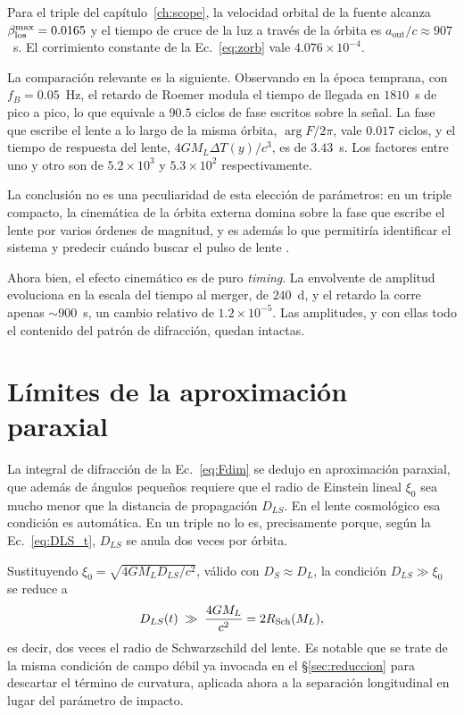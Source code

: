\documentclass[11pt,a4paper,openany]{book}
\newcommand{\aout}{a_{\mathrm{out}}}
\begin{document}
\begin{ejemplo}[title={Cinem\'atica frente a lente}]
Para el triple del cap\'itulo~\ref{ch:scope}, la velocidad orbital de la
fuente alcanza $\beta_{\rm los}^{\max}=0.0165$ y el tiempo de cruce de la luz
a trav\'es de la \'orbita es $\aout/c\approx907$~s. El corrimiento constante
de la Ec.~\eqref{eq:zorb} vale $4.076\times10^{-4}$.

La comparaci\'on relevante es la siguiente. Observando en la \'epoca
temprana, con $f_B=0.05$~Hz, el retardo de Roemer modula el tiempo de llegada
en $1810$~s de pico a pico, lo que equivale a $90.5$ ciclos de fase escritos
sobre la se\~nal. La fase que escribe el lente a lo largo de la misma
\'orbita, $\arg F/2\pi$, vale $0.017$ ciclos, y el tiempo de respuesta del
lente, $4GM_L\Delta T(y)/c^{3}$, es de $3.43$~s. Los factores entre uno y otro son de $5.2\times10^{3}$
y $5.3\times10^{2}$ respectivamente.

La conclusi\'on no es una peculiaridad de esta elecci\'on de par\'ametros: en
un triple compacto, la cinem\'atica de la \'orbita externa domina sobre la
fase que escribe el lente por varios \'ordenes de magnitud, y es adem\'as lo
que
permitir\'ia identificar el sistema y predecir cu\'ando buscar el pulso de
lente \citep{DOrazioLoeb2020}.

Ahora bien, el efecto cinem\'atico es de puro \emph{timing}. La envolvente de
amplitud evoluciona en la escala del tiempo al merger, de $240$~d, y el
retardo la corre apenas $\sim900$~s, un cambio relativo de
$1.2\times10^{-5}$. Las amplitudes, y con ellas todo el contenido del patr\'on
de difracci\'on, quedan intactas.
\end{ejemplo}

\section{L\'imites de la aproximaci\'on paraxial}
\label{sec:paraxial}

La integral de difracci\'on de la Ec.~\eqref{eq:Fdim} se dedujo en
aproximaci\'on paraxial, que adem\'as de \'angulos peque\~nos requiere que el
radio de Einstein lineal $\xi_0$ sea mucho menor que la distancia de
propagaci\'on $D_{LS}$. En el lente cosmol\'ogico esa condici\'on es
autom\'atica. En un triple no lo es, precisamente porque, seg\'un la
Ec.~\eqref{eq:DLS_t}, $D_{LS}$ se anula dos veces por \'orbita.

Sustituyendo $\xi_0=\sqrt{4GM_LD_{LS}/c^{2}}$, v\'alido con
$D_S\approx D_L$, la condici\'on $D_{LS}\gg\xi_0$ se reduce a
\begin{equation}
  D_{LS}(t)\;\gg\;\frac{4GM_L}{c^{2}}=2R_{\rm Sch}(M_L) ,
  \label{eq:paraxial_condition}
\end{equation}
es decir, dos veces el radio de Schwarzschild del lente. Es notable que se
trate de la misma condici\'on de campo d\'ebil ya invocada en el
\S\ref{sec:reduccion} para descartar el t\'ermino de curvatura, aplicada ahora
a la separaci\'on longitudinal en lugar del par\'ametro de impacto.
\end{document}
